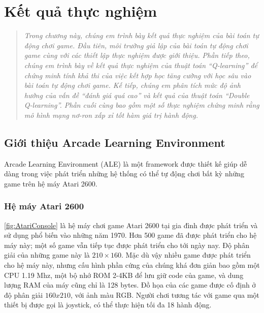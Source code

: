 \chapter{Kết quả thực nghiệm}
\ifpdf
\graphicspath{{Chapter4/Chapter4Figs/PNG/}{Chapter4/Chapter4Figs/PDF/}{Chapter4/Chapter4Figs/}}
\else
\graphicspath{{Chapter4/Chapter4Figs/EPS/}{Chapter4/Chapter4Figs/}}
\fi
\begin{quote}
	\textit{Trong chương này, chúng em trình bày kết quả thực nghiệm của bài toán tự động chơi game.
	Đầu tiên, môi trường giả lập của bài toán tự động chơi game cùng với các thiết lập thực nghiệm được giới thiệu.
	Phần tiếp theo, chúng em trình bày về kết quả thực nghiệm của thuật toán ``Q-learning'' để chứng minh tính khả thi của việc kết hợp học tăng cường với học sâu vào bài toán tự động chơi game.
	Kế tiếp, chúng em phân tích mức độ ảnh hưởng của vấn đề ``đánh giá quá cao'' và kết quả của thuật toán ``Double Q-learning''.
	Phần cuối cùng bao gồm một số thực nghiệm chứng minh rằng mô hình mạng nơ-ron xấp xỉ tốt hàm giá trị hành động.}
\end{quote}
 
\section{Giới thiệu Arcade Learning Environment}
Arcade Learning Environment (ALE) là một framework được thiết kế giúp dễ dàng trong việc phát triển những hệ thống có thể tự động chơi bất kỳ những game trên hệ máy Atari 2600.
\subsection{Hệ máy Atari 2600}
\ref{fig:AtariConsole} là hệ máy chơi game Atari 2600 tại gia đình được phát triển và sử dụng phổ biến vào những năm 1970.
Hơn 500 game đã được phát triển cho hệ máy này; một số game vẫn tiếp tục được phát triển cho tới ngày nay. 
Độ phân giải của những game này là $210 \times 160$. 
Mặc dù vậy nhiều game được phát triển cho hệ máy này, nhưng cấu hình phần cứng của chúng khá đơn giản bao gồm một CPU 1.19 Mhz, một bộ nhớ ROM 2-4KB để lưu giữ code của game, và dung lượng RAM của máy cũng chỉ là 128 bytes. 
Đồ họa của các game được cố định ở độ phân giải $160 x 210$, với ảnh màu RGB. 
Người chơi tương tác với game qua một thiết bị được gọi là joystick, có thể thực hiện tối đa 18 hành động.

